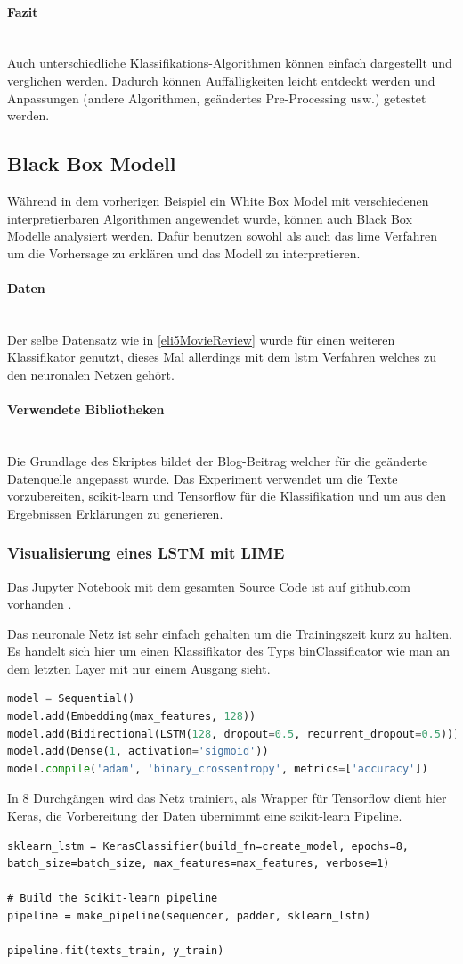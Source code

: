 \documentclass[
  12pt, %
  a4paper, %
  oneside, %
  openany, 
  numbers=noenddot, %
  BCOR=5mm, %
  parskip=half*, %
  thesis, %
]{bfhbook}
\newcommand{\parag}[1]{\paragraph*{#1}\mbox{}\\}
\begin{document}
\parag{Fazit}
Auch unterschiedliche Klassifikations-Algorithmen können einfach dargestellt und verglichen werden. Dadurch können Auffälligkeiten leicht entdeckt werden und Anpassungen (andere Algorithmen, geändertes Pre-Processing usw.) getestet werden. 

\subsection{Black Box Modell}
Während in dem vorherigen Beispiel ein \Gls{White Box} Model mit verschiedenen interpretierbaren Algorithmen angewendet wurde, können auch \Gls{Black Box} Modelle analysiert werden. Dafür benutzen sowohl \cite{ELI5} als auch \cite{lime} das \acrshort{lime} Verfahren um die Vorhersage zu erklären und das Modell zu interpretieren.

\parag{Daten}
Der selbe Datensatz wie in \ref{eli5MovieReview} wurde für einen weiteren Klassifikator genutzt, dieses Mal allerdings mit dem \acrfull{lstm} Verfahren welches zu den neuronalen Netzen gehört. 

\parag{Verwendete Bibliotheken}
Die Grundlage des Skriptes bildet der Blog-Beitrag \parencite{nThLIME} welcher für die geänderte Datenquelle angepasst wurde. 
Das Experiment verwendet \cite{nltk} um die Texte vorzubereiten, scikit-learn \cite{scikit-learnLink} und Tensorflow \cite{TensorFlow} für die Klassifikation und \cite{ELI5} um aus den Ergebnissen Erklärungen zu generieren. 


\subsubsection*{Visualisierung eines LSTM  mit LIME}
Das Jupyter Notebook mit dem gesamten Source Code ist auf github.com vorhanden \parencite{textClassLSTM}.
 
 Das neuronale Netz ist sehr einfach gehalten um die Trainingszeit kurz zu halten. Es handelt sich hier um einen Klassifikator des Typs \Gls{binClassificator} wie man an dem letzten Layer mit nur einem Ausgang sieht.
\begin{lstlisting}[language=Python, caption=LSTM Modell für LIME Movie Sentiment Analyse]
model = Sequential()
model.add(Embedding(max_features, 128))
model.add(Bidirectional(LSTM(128, dropout=0.5, recurrent_dropout=0.5)))
model.add(Dense(1, activation='sigmoid'))
model.compile('adam', 'binary_crossentropy', metrics=['accuracy'])
\end{lstlisting}

In 8 Durchgängen wird das Netz trainiert, als Wrapper für Tensorflow dient hier Keras, die Vorbereitung der Daten übernimmt eine scikit-learn Pipeline.
\begin{lstlisting}
sklearn_lstm = KerasClassifier(build_fn=create_model, epochs=8, batch_size=batch_size, max_features=max_features, verbose=1)

# Build the Scikit-learn pipeline
pipeline = make_pipeline(sequencer, padder, sklearn_lstm)

pipeline.fit(texts_train, y_train)
\end{lstlisting}
\end{document}
